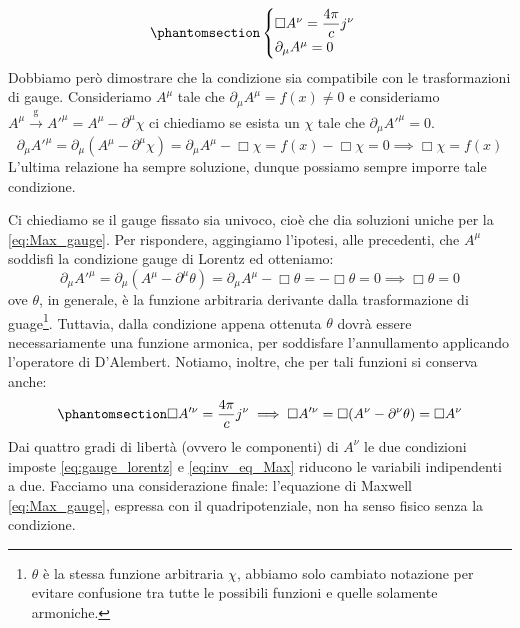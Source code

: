 \begin{equation}\phantomsection\label{eq:Max_gauge}
\begin{cases}
    \Box A^\nu=\dfrac{4\pi}{c}j^\nu\\
    \partial_\mu A^\mu=0 
\end{cases}
\end{equation}
Dobbiamo però dimostrare che la condizione sia compatibile con le trasformazioni di gauge. Consideriamo $A^\mu$ tale che 
$\partial_\mu A^\mu=f(x)\neq0$ e consideriamo $   A^\mu\xrightarrow[\text{}]{\text{g}}A'^\mu=A^\mu-\partial^\mu \chi$ ci chiediamo se esista un $\chi$ tale che $\partial_\mu A'^\mu=0$.
\begin{equation*}
    \partial_\mu A'^\mu=\partial_\mu(A^\mu-\partial^\mu \chi)=\partial_\mu A^\mu-\Box \chi=f(x)-\Box \chi=0 \implies \Box \chi=f(x)
\end{equation*}
L'ultima relazione ha sempre soluzione, dunque possiamo sempre imporre tale condizione. 

Ci chiediamo se il gauge fissato sia univoco, cioè che dia soluzioni uniche per la \eqref{eq:Max_gauge}.
Per rispondere, aggingiamo l'ipotesi, alle precedenti, che $A^\mu$ soddisfi la condizione gauge di Lorentz ed otteniamo:
\begin{equation*}
    \partial_\mu A'^\mu=\partial_\mu(A^\mu-\partial^\mu \theta)=\partial_\mu A^\mu-\Box \theta=-\Box \theta=0 \implies \Box \theta=0
\end{equation*}
ove $\theta$, in generale, è la funzione arbitraria derivante dalla trasformazione di guage\footnote{$\theta$ è la stessa funzione arbitraria $\chi$, abbiamo solo cambiato notazione per evitare confusione tra tutte le possibili funzioni e quelle solamente armoniche.}. Tuttavia, dalla condizione appena ottenuta $\theta$ dovrà essere necessariamente una funzione armonica, per soddisfare l'annullamento applicando l'operatore di D'Alembert.
Notiamo, inoltre, che per tali funzioni si conserva anche:
\begin{equation}\phantomsection\label{eq:inv_eq_Max}
   \Box A'^\nu=\dfrac{4\pi}{c}j^\nu \implies \Box A'^\nu=\Box(A^\nu-\partial^\nu \theta)=\Box A^\nu
\end{equation}
Dai quattro gradi di libertà (ovvero le componenti) di $A^\nu$ le due condizioni imposte \eqref{eq:gauge_lorentz} e \eqref{eq:inv_eq_Max} riducono le variabili indipendenti a due. Facciamo una considerazione finale: l'equazione di Maxwell \eqref{eq:Max_gauge}, espressa con il quadripotenziale, non ha senso fisico senza la condizione.
